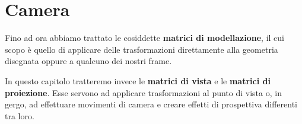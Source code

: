 \chapter{Camera}
Fino ad ora abbiamo trattato le cosiddette \textbf{matrici di modellazione}, il cui scopo \`e quello di applicare delle
trasformazioni direttamente alla geometria disegnata oppure a qualcuno dei nostri frame.

In questo capitolo tratteremo invece le \textbf{matrici di vista} e le \textbf{matrici di proiezione}. Esse servono ad
applicare trasformazioni al punto di vista o, in gergo, ad effettuare movimenti di camera e creare effetti di prospettiva
differenti tra loro.